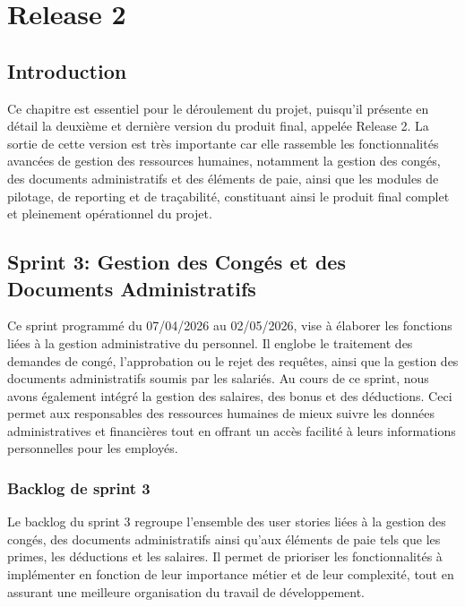 \chapter{Release 2}
\setlength{\intextsep}{8pt}
\setlength{\textfloatsep}{10pt}
\setlength{\floatsep}{8pt}
\setlength{\abovecaptionskip}{4pt}
\setlength{\belowcaptionskip}{2pt}
\setlength{\LTpre}{6pt}
\setlength{\LTpost}{6pt}

\setlength\LTleft{0pt}
\setlength\LTright{0pt}

\newpage

\section{Introduction}


Ce chapitre est essentiel pour le déroulement du projet, puisqu'il présente en détail la deuxième et dernière version du produit final, appelée Release 2. La sortie de cette version est très importante car elle rassemble les fonctionnalités avancées de gestion des ressources humaines, notamment la gestion des congés, des documents administratifs et des éléments de paie, ainsi que les modules de pilotage, de reporting et de traçabilité, constituant ainsi le produit final complet et pleinement opérationnel du projet.
\section{Sprint 3: Gestion  des Congés et des Documents Administratifs}

Ce sprint programmé du 07/04/2026 au 02/05/2026, vise à élaborer les fonctions liées à la gestion administrative du personnel. Il englobe le traitement des demandes de congé, l'approbation ou le rejet des requêtes, ainsi que la gestion des documents administratifs soumis par les salariés. Au cours de ce sprint, nous avons également intégré la gestion des salaires, des bonus et des déductions. Ceci permet aux responsables des ressources humaines de mieux suivre les données administratives et financières tout en offrant un accès facilité à leurs informations personnelles pour les employés.

\subsection{Backlog de sprint 3}
Le backlog du sprint 3 regroupe l’ensemble des user stories liées à la gestion des congés, des documents administratifs ainsi qu’aux éléments de paie tels que les primes, les déductions et les salaires. Il permet de prioriser les fonctionnalités à implémenter en fonction de leur importance métier et de leur complexité, tout en assurant une meilleure organisation du travail de développement.

